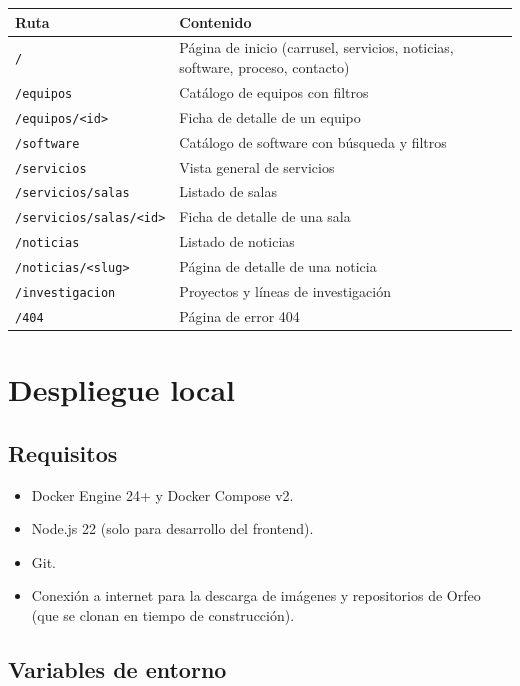 \documentclass[12pt,a4paper]{report}
\begin{document}
\begin{center}
\small
\begin{tabular}{|l|l|}
\hline
\textbf{Ruta} & \textbf{Contenido} \\
\hline
\texttt{/} & Página de inicio (carrusel, servicios, noticias, software, proceso, contacto) \\
\texttt{/equipos} & Catálogo de equipos con filtros \\
\texttt{/equipos/<id>} & Ficha de detalle de un equipo \\
\texttt{/software} & Catálogo de software con búsqueda y filtros \\
\texttt{/servicios} & Vista general de servicios \\
\texttt{/servicios/salas} & Listado de salas \\
\texttt{/servicios/salas/<id>} & Ficha de detalle de una sala \\
\texttt{/noticias} & Listado de noticias \\
\texttt{/noticias/<slug>} & Página de detalle de una noticia \\
\texttt{/investigacion} & Proyectos y líneas de investigación \\
\texttt{/404} & Página de error 404 \\
\hline
\end{tabular}
\end{center}

\chapter{Despliegue local}

\section{Requisitos}

\begin{itemize}
  \item Docker Engine 24+ y Docker Compose v2.
  \item Node.js 22 (solo para desarrollo del frontend).
  \item Git.
  \item Conexión a internet para la descarga de imágenes y repositorios de
        Orfeo (que se clonan en tiempo de construcción).
\end{itemize}

\section{Variables de entorno}
\end{document}
